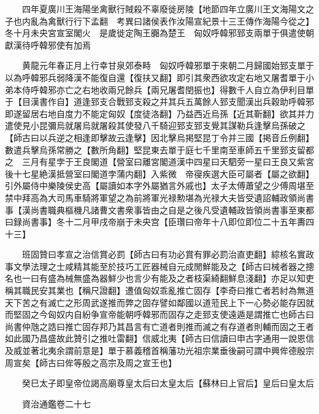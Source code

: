　　四年夏廣川王海陽坐禽獸行賊殺不辜廢徙房陵【地節四年立廣川王文海陽文之子也内亂為禽獸行行下孟翻　考異曰諸侯表作汝陽宣紀景十三王傳作海陽今從之】　冬十月未央宮宣室閣火　是歲徙定陶王嚻為楚王　匈奴呼韓邪郅支兩單于俱遣使朝獻漢待呼韓邪使有加焉

　　黄龍元年春正月上行幸甘泉郊泰畤　匈奴呼韓邪單于來朝二月歸國始郅支單于以為呼韓邪兵弱降漢不能復自還【復扶又翻】即引其衆西欲攻定右地又屠耆單于小弟本侍呼韓邪亦亡之右地收兩兄餘兵【兩兄屠耆閏振也】得數千人自立為伊利目單于【目漢書作自】道逢郅支合戰郅支殺之并其兵五萬餘人郅支聞漢出兵穀助呼韓邪即遂留居右地自度力不能定匈奴【度徒洛翻】乃益西近烏孫【近其靳翻】欲其并力遣使見小昆彌烏就屠烏就屠殺其使發八千騎迎郅支郅支覺其謀勒兵逢擊烏孫破之【師古曰以兵逆之相逢即擊故云逢擊】因北擊烏掲堅昆丁令并三國【掲音丘例翻】數遣兵擊烏孫常勝之【數所角翻】堅昆東去單于庭七千里南至車師五千里郅支留都之　三月有星孛于王良閣道【營室曰離宮閣道漢中四星曰天駟旁一星曰王良又紫宮後十七星絶漢抵營室曰閣道孛蒲内翻】入紫微　帝寑疾選大臣可屬者【屬之欲翻】引外屬侍中樂陵侯史高【屬讀如本字外屬猶言外戚也】太子太傅蕭望之少傅周堪至禁中拜高為大司馬車騎將軍望之為前將軍光禄勲堪為光禄大夫皆受遺詔輔政領尚書事【漢尚書職典樞機凡諸曹文書衆事皆由之自是之後凡受遺輔政皆領尚書事至東都曰録尚書事】冬十二月甲戌帝崩于未央宫【臣瓚曰帝年十八即位即位二十五年夀四十三】

　　班固贊曰孝宣之治信賞必罰【師古曰有功必賞有罪必罰治直吏翻】綜核名實政事文學法理之士咸精其能至於技巧工匠器械自元成閒鮮能及之【師古曰械者器之摠名也一曰有盛為械無盛為器鮮少也言少有能及之者枝渠綺翻鮮息淺翻】亦足以知吏稱其職民安其業也【稱尺證翻】遭值匈奴乖亂推亡固存【李奇曰推亡者若紂為無道天下苦之有滅亡之形周武遂推而弊之固存譬如鄰國以道蒞民上下一心勢必能存因就而堅固之今匈奴内自紛争宣帝能朝呼韓邪而固存之走郅支使遠遁是謂推亡也師古曰尚書仲虺之誥曰推亡固存邦乃其昌言有亡道者則推而滅之有存道者則輔而固之王者如此國乃昌盛故此贊引之推吐雷翻】信威北夷【師古曰信讀曰申古字通用一說恩信及威並著北夷余謂前意是】單于慕義稽首稱藩功光祖宗業垂後嗣可謂中興侔德殷宗周宣矣【師古曰侔等殷之高宗及周之宣王也】

　　癸巳太子即皇帝位謁高廟尊皇太后曰太皇太后【蘇林曰上官后】皇后曰皇太后

　　資治通鑑卷二十七


    


 


 



 

 
  







